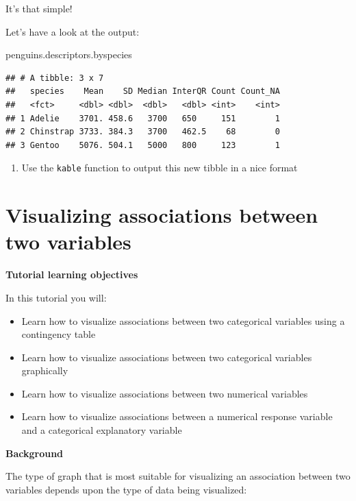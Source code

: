 \documentclass[
]{book}
\newenvironment{Shaded}{\begin{snugshade}}{\end{snugshade}}
\newcommand{\NormalTok}[1]{#1}
\providecommand{\tightlist}{%
  \setlength{\itemsep}{0pt}\setlength{\parskip}{0pt}}
\begin{document}
It's that simple!

Let's have a look at the output:

\begin{Shaded}
\begin{Highlighting}[]
\NormalTok{penguins.descriptors.byspecies}
\end{Highlighting}
\end{Shaded}

\begin{verbatim}
## # A tibble: 3 x 7
##   species    Mean    SD Median InterQR Count Count_NA
##   <fct>     <dbl> <dbl>  <dbl>   <dbl> <int>    <int>
## 1 Adelie    3701. 458.6   3700   650     151        1
## 2 Chinstrap 3733. 384.3   3700   462.5    68        0
## 3 Gentoo    5076. 504.1   5000   800     123        1
\end{verbatim}

\begin{enumerate}
\def\labelenumi{\arabic{enumi}.}
\tightlist
\item
  Use the \texttt{kable} function to output this new tibble in a nice format
\end{enumerate}

\chapter{Visualizing associations between two variables}\label{vis_twovar}

\textbf{Tutorial learning objectives}

In this tutorial you will:

\begin{itemize}
\tightlist
\item
  Learn how to visualize associations between two categorical variables using a contingency table
\item
  Learn how to visualize associations between two categorical variables graphically
\item
  Learn how to visualize associations between two numerical variables
\item
  Learn how to visualize associations between a numerical response variable and a categorical explanatory variable
\end{itemize}

\textbf{Background}

The type of graph that is most suitable for visualizing an association between two variables depends upon the type of data being visualized:
\end{document}
